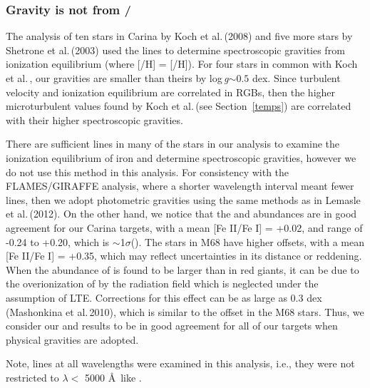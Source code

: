 \documentclass{emulateapj}
\newcommand\logg{log\,{\it g}}
\newcommand\etal{{\rm et al.\,}}
\begin{document}
\subsubsection{Gravity is not from / \label{gravity}}

The analysis of ten stars in Carina by Koch \etal (2008) and five more
stars by Shetrone \etal (2003) used the  lines to determine 
spectroscopic gravities from ionization equilibrium 
(where [/H] = [/H]).   
For four stars in common with Koch \etal, our gravities are smaller 
than theirs by \logg $\sim 0.5$ dex.   Since turbulent velocity and
ionization equilibrium are correlated in RGBs, then the higher 
microturbulent values found by Koch \etal (see Section~\ref{temps})
are correlated with their higher spectroscopic gravities. 


There are sufficient  lines in many of the stars in our analysis 
to examine the ionization equilibrium of iron and determine spectroscopic 
gravities, however we do not use this method in this analysis.  For 
consistency with the FLAMES/GIRAFFE analysis, where a shorter wavelength 
interval meant fewer  lines, then we adopt photometric gravities 
using the same methods as in Lemasle \etal (2012).
On the other hand, we notice that the  and  
abundances are in good agreement for our Carina targets, 
with a mean [Fe II/Fe I] = +0.02, and range of -0.24 to +0.20, 
which is $\sim$1$\sigma$().   The stars
in M68 have higher offsets, with a mean [Fe II/Fe I] = +0.35, which
may reflect uncertainties in its distance or reddening.
%
When the abundance of  is found to be larger than
 in red giants, it can be due to the overionization of  
by the radiation field which is neglected under the assumption of
LTE.  Corrections for this effect can be as large as 0.3 dex 
(Mashonkina \etal  2010), which is similar to the offset in the 
M68 stars. Thus, we consider our  and 
results to be in good agreement for all of our targets when 
physical gravities are adopted.    
 
Note,  lines at all wavelengths were examined in this analysis,
i.e., they were not restricted to $\lambda <$ 5000 \AA\ like . 
\end{document}
